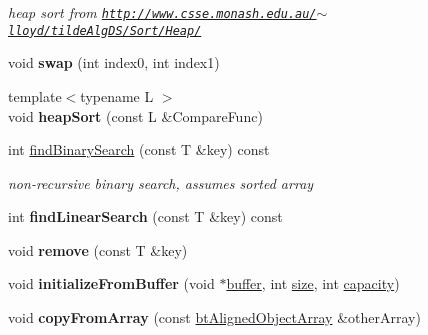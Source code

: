 \begin{DoxyCompactItemize}
\begin{DoxyCompactList}\small\item\em heap sort from \href{http://www.csse.monash.edu.au/~lloyd/tildeAlgDS/Sort/Heap/}{\tt http\+://www.\+csse.\+monash.\+edu.\+au/$\sim$lloyd/tilde\+Alg\+D\+S/\+Sort/\+Heap/} \end{DoxyCompactList}\item 
\hypertarget{classbt_aligned_object_array_a4aeacaa461686c9394aabd3c139179b4}{void {\bfseries swap} (int index0, int index1)}\label{classbt_aligned_object_array_a4aeacaa461686c9394aabd3c139179b4}

\item 
\hypertarget{classbt_aligned_object_array_aa0979d77c9b1e397d656a0b1ef88b4e6}{{\footnotesize template$<$typename L $>$ }\\void {\bfseries heap\+Sort} (const L \&Compare\+Func)}\label{classbt_aligned_object_array_aa0979d77c9b1e397d656a0b1ef88b4e6}

\item 
\hypertarget{classbt_aligned_object_array_a9c72e0a8fa512a04e11fe8c31b09260a}{int \hyperlink{classbt_aligned_object_array_a9c72e0a8fa512a04e11fe8c31b09260a}{find\+Binary\+Search} (const T \&key) const }\label{classbt_aligned_object_array_a9c72e0a8fa512a04e11fe8c31b09260a}

\begin{DoxyCompactList}\small\item\em non-\/recursive binary search, assumes sorted array \end{DoxyCompactList}\item 
\hypertarget{classbt_aligned_object_array_ae7b14c469b51e0ea010d3b9d701bc1b8}{int {\bfseries find\+Linear\+Search} (const T \&key) const }\label{classbt_aligned_object_array_ae7b14c469b51e0ea010d3b9d701bc1b8}

\item 
\hypertarget{classbt_aligned_object_array_a6782242f06df5bab0cffbd23195cd9cd}{void {\bfseries remove} (const T \&key)}\label{classbt_aligned_object_array_a6782242f06df5bab0cffbd23195cd9cd}

\item 
\hypertarget{classbt_aligned_object_array_aa8d21bd5fe47cfe0216990b78fef665e}{void {\bfseries initialize\+From\+Buffer} (void $\ast$\hyperlink{structbuffer}{buffer}, int \hyperlink{classbt_aligned_object_array_a6bdd14c7599ecb95e8d83dd5a715f9b7}{size}, int \hyperlink{classbt_aligned_object_array_afcfda91263ff04e1efcbe62bf68e2d1d}{capacity})}\label{classbt_aligned_object_array_aa8d21bd5fe47cfe0216990b78fef665e}

\item 
\hypertarget{classbt_aligned_object_array_a1464bd66b0e5e3880b4c7aa4a2ce13a1}{void {\bfseries copy\+From\+Array} (const \hyperlink{classbt_aligned_object_array}{bt\+Aligned\+Object\+Array} \&other\+Array)}\label{classbt_aligned_object_array_a1464bd66b0e5e3880b4c7aa4a2ce13a1}

\end{DoxyCompactItemize}
